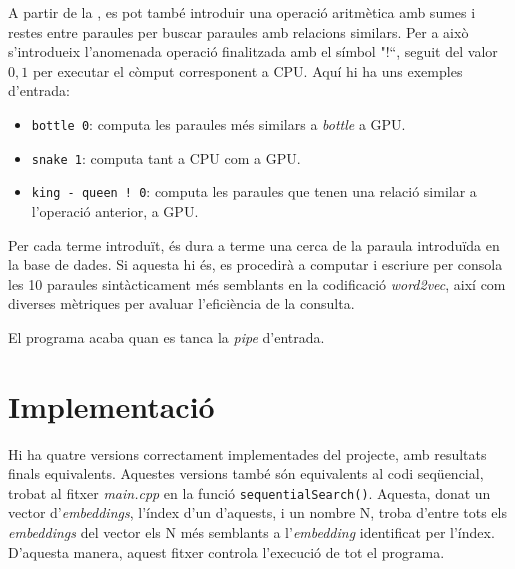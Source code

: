 \documentclass[catalan,10pt,a4paper]{article}
\begin{document}
A partir de la , es pot també introduir una operació aritmètica amb sumes i restes entre paraules per buscar paraules amb relacions similars. Per a això s'introdueix l'anomenada operació finalitzada amb el símbol "!``, seguit del valor ${0,1}$ per executar el còmput corresponent a CPU.
Aquí hi ha uns exemples d'entrada:
\begin{itemize}
	\item \verb|bottle 0|: computa les paraules més similars a \textit{bottle} a GPU.
	\item \verb|snake 1|: computa tant a CPU com a GPU.
	\item \verb|king - queen ! 0|: computa les paraules que tenen una relació similar a l'operació anterior, a GPU.
\end{itemize}
Per cada terme introduït, és dura a terme una cerca de la paraula introduïda en la base de dades. Si aquesta hi és, es procedirà a computar i escriure per consola les 10 paraules sintàcticament més semblants en la codificació \textit{word2vec}, així com diverses mètriques per avaluar l'eficiència de la consulta.

El programa acaba quan es tanca la \textit{pipe} d'entrada.
\section*{Implementació}
Hi ha quatre versions correctament implementades del projecte, amb resultats finals equivalents.\newline
Aquestes versions també són equivalents al codi seqüencial, trobat al fitxer \textit{main.cpp} en la funció \verb|sequentialSearch()|. Aquesta, donat un vector d'\textit{embeddings}, l'índex d'un d'aquests, i un nombre N, troba d'entre tots els \textit{embeddings} del vector els N més semblants a l'\textit{embedding} identificat per l'índex. D'aquesta manera, aquest fitxer controla l'execució de tot el programa.
\end{document}
